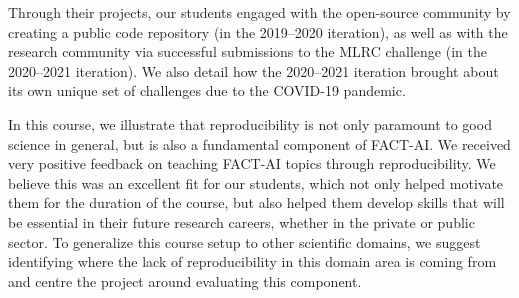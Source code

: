 \documentclass[letterpaper]{article}
\begin{document}
Through their projects, our students engaged with the open-source community by creating a public code repository (in the 2019--2020 iteration), as well as with the research community via successful submissions to the MLRC challenge (in the 2020--2021 iteration). 
We also detail how the 2020--2021 iteration brought about its own unique set of challenges due to the COVID-19 pandemic. 

In this course, we illustrate that reproducibility is not only paramount to good science in general, but is also a fundamental component of FACT-AI. 
We received very positive feedback on teaching FACT-AI topics through reproducibility. We believe this was an excellent fit for our students, which not only helped motivate them for the duration of the course, but also helped them develop skills that will be essential in their future research careers, whether in the private or public sector. 
To generalize this course setup to other scientific domains, we suggest identifying where the lack of reproducibility in this domain area is coming from and centre the project around evaluating this component. 
\end{document}

